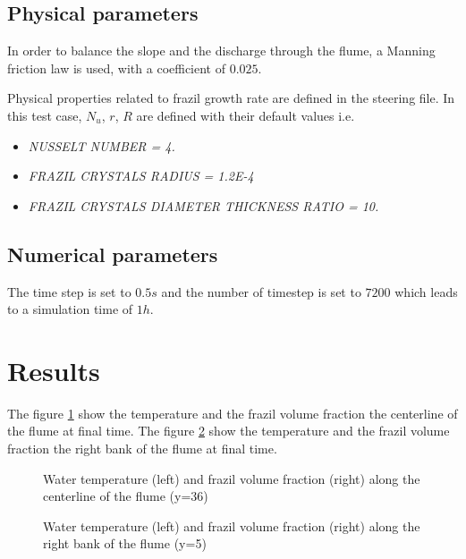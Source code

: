 \subsection{Physical parameters}

In order to balance the slope and the discharge through the flume, a Manning friction law is used, with a coefficient of $0.025$.

Physical properties related to frazil growth rate are defined in the \khione steering file. 
In this test case, $N_u$, $r$, $R$ are defined with their default values i.e.
\begin{itemize}
	\item\textit{NUSSELT NUMBER = 4.}
	\item\textit{FRAZIL CRYSTALS RADIUS = 1.2E-4}
	\item\textit{FRAZIL CRYSTALS DIAMETER THICKNESS RATIO  = 10.}
\end{itemize}

\subsection{Numerical parameters}
The time step is set to $0.5s$ and the number of timestep is set to $7200$ which leads to a simulation time of $1h$.

\section{Results}

The figure \ref{fig:growth_temp} show the temperature and the frazil volume fraction the centerline of the flume at final time.
The figure \ref{fig:growth_temp_rb} show the temperature and the frazil volume fraction the right bank of the flume at final time.

\begin{figure}[H]
    \begin{center}
    \end{center}
    \caption{Water temperature (left) and frazil volume fraction (right) along the centerline of the flume (y=36)}
    \label{fig:growth_temp}
\end{figure}
\begin{figure}[H]
    \begin{center}
    \end{center}
    \caption{Water temperature (left) and frazil volume fraction (right) along the right bank of the flume (y=5)}
    \label{fig:growth_temp_rb}
\end{figure}

